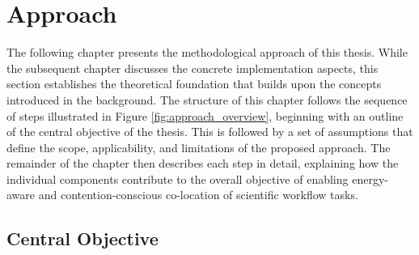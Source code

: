 \section{Approach}
\label{cha:approach}

The following chapter presents the methodological approach of this thesis. While the subsequent chapter discusses the concrete implementation aspects, this section establishes the theoretical foundation that builds upon the concepts introduced in the background. The structure of this chapter follows the sequence of steps illustrated in Figure \ref{fig:approach_overview}, beginning with an outline of the central objective of the thesis. This is followed by a set of assumptions that define the scope, applicability, and limitations of the proposed approach. The remainder of the chapter then describes each step in detail, explaining how the individual components contribute to the overall objective of enabling energy-aware and contention-conscious co-location of scientific workflow tasks.

\subsection{Central Objective}
\label{sec:central_objective}

